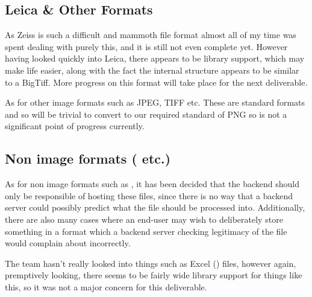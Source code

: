 \subsection{Leica \& Other Formats}
As Zeiss is such a difficult and mammoth file format almost all of my time was spent dealing with purely this,
and it is still not even complete yet. However having looked quickly into Leica, there appears to be
library support, which may make life easier, along with the fact the internal structure appears to be similar to
a BigTiff. More progress on this format will take place for the next deliverable.

As for other image formats such as JPEG, TIFF etc. These are standard formats and so will be trivial to
convert to our required standard of PNG so is not a significant point of progress currently.

\subsection{Non image formats ( etc.)}
As for non image formats such as , it has been decided that the backend should only be responsible of hosting these
files, since there is no way that a backend server could possibly predict what the file should be processed into.
Additionally, there are also many cases where an end-user may wish to deliberately store something in a format
which a backend server checking legitimacy of the file would complain about incorrectly.

The team hasn't really looked into things such as Excel () files, however again, premptively looking, there seems to
be fairly wide library support for things like this, so it was not a major concern for this deliverable.
